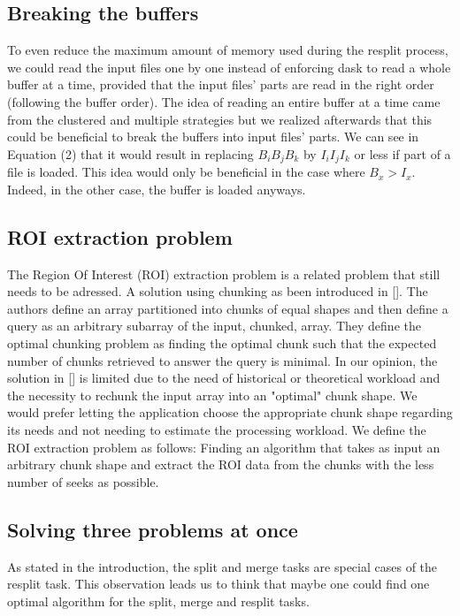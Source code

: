 \documentclass[conference]{IEEEtran}
\begin{document}
\subsection{Breaking the buffers}
To even reduce the maximum amount of memory used during the resplit process, we
could read the input files one by one instead of enforcing dask to read a whole
buffer at a time, provided that the input files' parts are read in the right
order (following the buffer order). The idea of reading an entire buffer at a
time came from the clustered and multiple strategies but we realized afterwards
that this could be beneficial to break the buffers into input files' parts. We
can see in Equation (2) that it would result in replacing $B_iB_jB_k$ by
$I_iI_jI_k$ or less if part of a file is loaded. This idea would only be
beneficial in the case where $B_x>I_x$. Indeed, in the other case, the buffer is
loaded anyways.

\subsection{ROI extraction problem}
The Region Of Interest (ROI) extraction problem is a related problem that still needs
to be adressed. A solution using chunking as been introduced in []. The authors
define an array partitioned into chunks of equal shapes and then define a
query as an arbitrary subarray of the input, chunked, array. They define the
optimal chunking problem as finding the optimal chunk such that the expected
number of chunks retrieved to answer the query is minimal. In our opinion, the
solution in [] is limited due to the need of historical or theoretical workload
and the necessity to rechunk the input array into an "optimal" chunk shape. We
would prefer letting the application choose the appropriate chunk shape
regarding its needs and not needing to estimate the processing workload. We
define the ROI extraction problem as follows: Finding an algorithm that takes
as input an arbitrary chunk shape and extract the ROI data from the chunks with
the less number of seeks as possible.

\subsection{Solving three problems at once}
As stated in the introduction, the split and merge tasks are special cases of
the resplit task. This observation leads us to think that maybe one could find
one optimal algorithm for the split, merge and resplit tasks.
\end{document}
